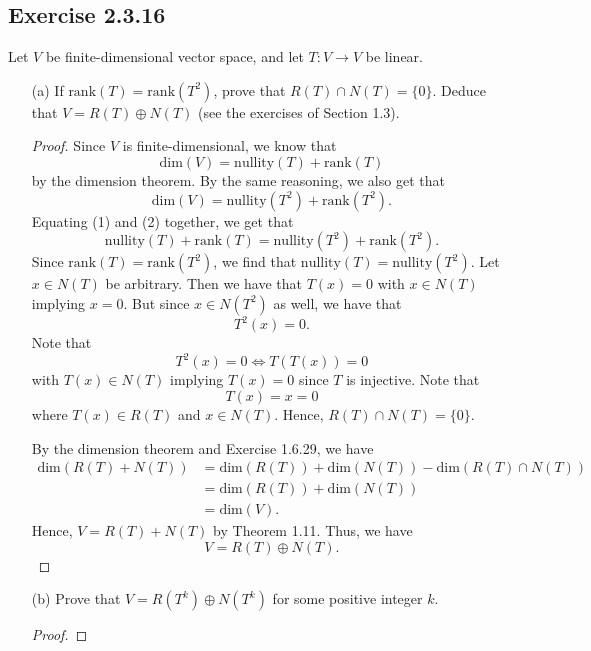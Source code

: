 \subsection*{Exercise 2.3.16} Let \( V  \) be finite-dimensional vector space, and let \( T: V \to V  \) be linear.
\begin{enumerate}
    \item[(a)] If \( \text{rank}(T) = \text{rank}(T^{2}) \), prove that \( R(T) \cap N(T) = \{ 0  \}   \). Deduce that \( V = R(T) \oplus N(T)  \) (see the exercises of Section 1.3).
        \begin{proof}
        Since \( V  \) is finite-dimensional, we know that 
        \[  \text{dim}(V) = \text{nullity}(T) + \text{rank}(T) \tag{1} \]
            by the dimension theorem. By the same reasoning, we also get that
            \[  \text{dim}(V) = \text{nullity}(T^{2}) + \text{rank}(T^{2}). \tag{2} \]
            Equating (1) and (2) together, we get that
            \[  \text{nullity}(T) + \text{rank}(T) = \text{nullity}(T^{2}) + \text{rank}(T^{2}). \]
            Since \( \text{rank}(T) = \text{rank}(T^{2} )  \), we find that \( \text{nullity}(T) = \text{nullity}(T^{2}) \). Let \( x \in N(T)  \) be arbitrary. Then we have that \( T(x) = 0  \) with \( x \in N(T)  \) implying \( x = 0  \). But since \( x \in N(T^{2}) \) as well, we have that
            \[  T^{2}(x) = 0. \]
    Note that 
            \[  T^{2}(x) = 0 \iff T(T(x)) = 0  \]
            with \( T(x) \in N(T)  \) implying \( T(x) = 0  \) since \( T  \) is injective. Note that 
            \[  T(x) = x = 0  \]
            where \( T(x) \in R(T)  \) and \( x \in N(T)  \). Hence, \( R(T) \cap N(T) = \{ 0  \}   \).

            By the dimension theorem and Exercise 1.6.29, we have
            \begin{align*}
                \text{dim}(R(T) + N(T)) &= \text{dim}(R(T)) + \text{dim}(N(T)) - \text{dim}(R(T) \cap N(T)) \\
                                        &=  \text{dim}(R(T)) + \text{dim}(N(T)) \\
                                        &= \text{dim}(V).
            \end{align*}
Hence, \( V = R(T) + N(T)  \) by Theorem 1.11. Thus, we have
\[  V = R(T) \oplus N(T). \]
        \end{proof}

    \item[(b)] Prove that \( V = R(T^{k }) \oplus N(T^{k }) \) for some positive integer \( k  \).
            \begin{proof}
            

\end{proof}
\end{enumerate}

